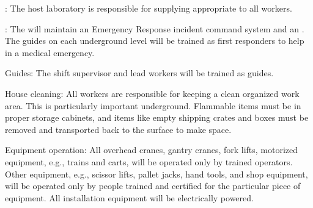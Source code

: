 {:} 
The host laboratory is responsible for supplying appropriate  to all workers. 

{:} The  will maintain an Emergency Response incident command system and an .  The guides on each underground level will be trained as first responders to help in a medical emergency.
  
  Guides: The shift supervisor and lead workers will be trained as guides.
  
  {House cleaning:} All workers are responsible for keeping a clean organized work area. This is particularly important underground. Flammable items must be in proper storage cabinets, and items like empty shipping crates and boxes must be removed and 
transported back to the surface to make space.


{Equipment operation:} All overhead cranes, gantry cranes, fork lifts, motorized equipment, e.g., trains and carts, will be operated only by trained  operators. 
Other equipment, e.g., scissor lifts, pallet jacks, hand tools, and shop equipment, will be operated only by people trained
and certified for the particular piece of equipment. All installation equipment will be electrically powered.
